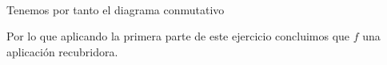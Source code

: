 \documentclass[12pt]{article}
\begin{document}
\begin{ejercicio}
\begin{align*}
        \end{align*}
        Tenemos por tanto el diagrama conmutativo
        \begin{figure}[H]
            \centering
        \end{figure}
        \noindent
        Por lo que aplicando la primera parte de este ejercicio concluimos que $f$ una aplicación recubridora.
    \end{ejercicio}
\end{document}
